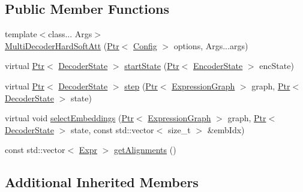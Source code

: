 \subsection*{Public Member Functions}
\begin{DoxyCompactItemize}
\item 
{\footnotesize template$<$class... Args$>$ }\\\hyperlink{classmarian_1_1MultiDecoderHardSoftAtt_a78a197b705bb25ecbbafb6006e963036}{Multi\+Decoder\+Hard\+Soft\+Att} (\hyperlink{namespacemarian_ad1a373be43a00ef9ce35666145137b08}{Ptr}$<$ \hyperlink{classmarian_1_1Config}{Config} $>$ options, Args...\+args)
\item 
virtual \hyperlink{namespacemarian_ad1a373be43a00ef9ce35666145137b08}{Ptr}$<$ \hyperlink{classmarian_1_1DecoderState}{Decoder\+State} $>$ \hyperlink{classmarian_1_1MultiDecoderHardSoftAtt_a82443e3da9466ff952ac9deeb0a77df6}{start\+State} (\hyperlink{namespacemarian_ad1a373be43a00ef9ce35666145137b08}{Ptr}$<$ \hyperlink{classmarian_1_1EncoderState}{Encoder\+State} $>$ enc\+State)
\item 
virtual \hyperlink{namespacemarian_ad1a373be43a00ef9ce35666145137b08}{Ptr}$<$ \hyperlink{classmarian_1_1DecoderState}{Decoder\+State} $>$ \hyperlink{classmarian_1_1MultiDecoderHardSoftAtt_a9dc01206082f6b287300c2ee6460d3ba}{step} (\hyperlink{namespacemarian_ad1a373be43a00ef9ce35666145137b08}{Ptr}$<$ \hyperlink{classmarian_1_1ExpressionGraph}{Expression\+Graph} $>$ graph, \hyperlink{namespacemarian_ad1a373be43a00ef9ce35666145137b08}{Ptr}$<$ \hyperlink{classmarian_1_1DecoderState}{Decoder\+State} $>$ state)
\item 
virtual void \hyperlink{classmarian_1_1MultiDecoderHardSoftAtt_a2c0c368e276e2db20c116b20497b1bb6}{select\+Embeddings} (\hyperlink{namespacemarian_ad1a373be43a00ef9ce35666145137b08}{Ptr}$<$ \hyperlink{classmarian_1_1ExpressionGraph}{Expression\+Graph} $>$ graph, \hyperlink{namespacemarian_ad1a373be43a00ef9ce35666145137b08}{Ptr}$<$ \hyperlink{classmarian_1_1DecoderState}{Decoder\+State} $>$ state, const std\+::vector$<$ size\+\_\+t $>$ \&emb\+Idx)
\item 
const std\+::vector$<$ \hyperlink{namespacemarian_a498d8baf75b754011078b890b39c8e12}{Expr} $>$ \hyperlink{classmarian_1_1MultiDecoderHardSoftAtt_a5663940ea8e359b7af4ebb16380fe01e}{get\+Alignments} ()
\end{DoxyCompactItemize}
\subsection*{Additional Inherited Members}


